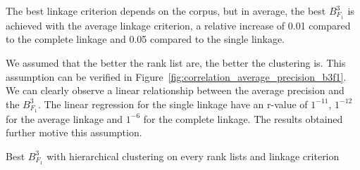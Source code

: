 The best linkage criterion depends on the corpus, but in average, the best $B^3_{F_1}$ is achieved with the average linkage criterion, a relative increase of 0.01 compared to the complete linkage and 0.05 compared to the single linkage.

We assumed that the better the rank list are, the better the clustering is.
This assumption can be verified in Figure~\ref{fig:correlation_average_precision_b3f1}.
We can clearly observe a linear relationship between the average precision and the $B^3_{F_1}$.
The linear regression for the single linkage have an r-value of $1^{-11}$, $1^{-12}$ for the average linkage and $1^{-6}$ for the complete linkage.
The results obtained further motive this assumption.

\begin{table}
  \centering
  \caption{Best $B^3_{F_1}$ with hierarchical clustering on every rank lists and linkage criterion}
  \label{tab:hierarchical_clustering}


\end{table}
